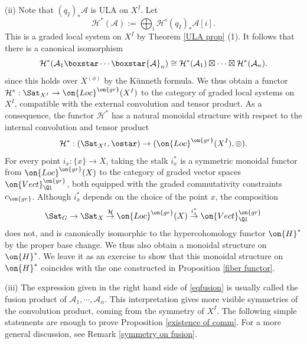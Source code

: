 \documentclass[]{pcmi}
\theoremstyle{plain}
\theoremstyle{remark}
\theoremstyle{definition}
\newcommand{\mA}{{\mathcal A}}
\newcommand{\mH}{{\mathcal H}}
\begin{document}
(ii) Note that $(q_I)_*\mA$ is ULA on $X^I$. Let
\begin{equation}\label{relative coh}
\mH^*(\mA):=\bigoplus_i \mH^i(q_I)_*\mA[i].
\end{equation} 
This is a graded local system on $X^I$ by Theorem \ref{ULA prop} (1). It follows that there is a canonical isomorphism
\begin{equation}\label{monoidal functor}
\mH^*(\mA_1\boxstar\cdots\boxstar\mA_n)\cong \mH^*(\mA_1)\boxtimes\cdots\boxtimes\mH^*(\mA_n).
\end{equation}
since this holds over $X^{(\phi)}$ by the K\"unneth formula. We thus obtain a functor $\mH^*: \Sat_{X^I}\to \on{Loc}^{\on{gr}}(X^I)$ to the category of graded local systems on $X^I$, compatible with the external convolution and tensor product.   As a consequence, the functor $\mH^*$ has a natural monoidal structure with respect to the internal convolution and tensor product
\[\mH^*: (\Sat_{X^I},\ostar)\to (\on{Loc}^{\on{gr}}(X^I),\otimes).\]
For every  point $i_x:\{x\}\to X$, taking the stalk $i_x^*$ is a symmetric monoidal functor from $\on{Loc}^{\on{gr}}(X)$ to the category of graded vector spaces $\on{Vect}^{\on{gr}}_{\Ql}$, both equipped with the graded commutativity constraints $c_{\on{gr}}$. Although $i_x^*$ depends on the choice of the point $x$,
the composition
\begin{equation}\label{decomp coh}
\Sat_G\to \Sat_X\stackrel{\mH}{\to} \on{Loc}^{\on{gr}}(X)\stackrel{i_x^*}{\to}\on{Vect}^{\on{gr}}_{\Ql}
\end{equation}
does not, and is canonically isomorphic to the hypercohomology functor $\on{H}^*$ by the proper base change. We thus also obtain a monoidal structure on $\on{H}^*$. We leave it as an exercise to show that this monoidal structure on $\on{H}^*$  coincides with the one constructed in Proposition \ref{fiber functor}.



(iii) The expression given in the right hand side of \eqref{eqfusion} is usually called the fusion product of $\mA_1,\cdots,\mA_n$. This interpretation gives more visible symmetries of the convolution product, coming from the symmetry of $X^I$. The following simple statements are enough to prove Proposition \ref{existence of comm}. For a more general discussion, see Remark \ref{symmetry on fusion}.
\end{document}
